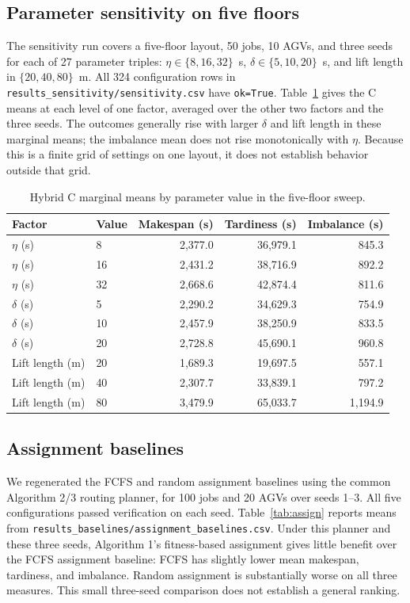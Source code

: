 \documentclass[11pt]{article}
\begin{document}
\subsection{Parameter sensitivity on five floors}

The sensitivity run covers a five-floor layout, 50 jobs, 10 AGVs, and three
seeds for each of 27 parameter triples: $\eta\in\{8,16,32\}$~s,
$\delta\in\{5,10,20\}$~s, and lift length in $\{20,40,80\}$~m. All 324
configuration rows in \texttt{results\_sensitivity/sensitivity.csv} have
\texttt{ok=True}. Table~\ref{tab:sensitivity-c} gives the C means at each
level of one factor, averaged over the other two factors and the three seeds.
The outcomes generally rise with larger $\delta$ and lift length in these
marginal means; the imbalance mean does not rise monotonically with $\eta$.
Because this is a finite grid of settings on one layout, it does not establish
behavior outside that grid.

\begin{table}[htbp]
\centering
\small
\caption{Hybrid C marginal means by parameter value in the five-floor sweep.}
\label{tab:sensitivity-c}
\begin{tabular}{llrrr}
\toprule
Factor & Value & Makespan (s) & Tardiness (s) & Imbalance (s) \\
\midrule
$\eta$ (s) & 8  & 2,377.0 & 36,979.1 & 845.3 \\
$\eta$ (s) & 16 & 2,431.2 & 38,716.9 & 892.2 \\
$\eta$ (s) & 32 & 2,668.6 & 42,874.4 & 811.6 \\
$\delta$ (s) & 5  & 2,290.2 & 34,629.3 & 754.9 \\
$\delta$ (s) & 10 & 2,457.9 & 38,250.9 & 833.5 \\
$\delta$ (s) & 20 & 2,728.8 & 45,690.1 & 960.8 \\
Lift length (m) & 20 & 1,689.3 & 19,697.5 & 557.1 \\
Lift length (m) & 40 & 2,307.7 & 33,839.1 & 797.2 \\
Lift length (m) & 80 & 3,479.9 & 65,033.7 & 1,194.9 \\
\bottomrule
\end{tabular}
\end{table}

\subsection{Assignment baselines}

We regenerated the FCFS and random assignment baselines using the common
Algorithm 2/3 routing planner, for 100 jobs and 20 AGVs over seeds 1--3. All
five configurations passed verification on each seed. Table~\ref{tab:assign}
reports means from \texttt{results\_baselines/assignment\_baselines.csv}.
Under this planner and these three seeds, Algorithm 1's fitness-based
assignment gives little benefit over the FCFS assignment baseline: FCFS has
slightly lower mean makespan, tardiness, and imbalance. Random assignment is
substantially worse on all three measures. This small three-seed comparison
does not establish a general ranking.
\end{document}
